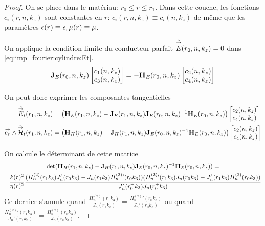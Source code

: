     \begin{proof}
      On se place dans le matériau: \(r_0 \le r \le r_ 1 \). Dans cette couche, les fonctions \(c_i(r,n,k_z)\) sont constantes en \(r\): \(c_i(r,n,k_z) \equiv c_i(n,k_z)\) de même que les paramètres \(\epsilon(r)\equiv \epsilon, \mu(r)\equiv \mu\).

      On applique la condition limite du conducteur parfait \(\hat {{\overset{\rightarrow}{E}}}(r_0,n,k_z) = 0\) dans \eqref{eq:imp_fourier:cylindre:Et}.
      \begin{equation*}
        \mathbf{J}_{E}(r_0,n,k_z)
        \begin{bmatrix}
          c_1(n,k_z) \\
          c_3(n,k_z)
        \end{bmatrix}
        =-\mathbf{H}_{E}(r_0,n,k_z)
        \begin{bmatrix}
          c_2(n,k_z) \\
          c_4(n,k_z)
        \end{bmatrix}
      \end{equation*}

      On peut donc exprimer les composantes tangentielles%
      \begin{align*}
        \hat {{\overset{\rightarrow}{E}}}_t(r_1,n,k_z) &=
        \left(\mathbf{H}_{E}(r_1,n,k_z) - \mathbf{J}_{E}(r_1,n,k_z)\mathbf{J}_{E}(r_0,n,k_z)^{-1}\mathbf{H}_{E}(r_0,n,k_z)\right)
        \begin{bmatrix}
          c_2(n,k_z) \\
          c_4(n,k_z)
        \end{bmatrix}
        \\
        {\overset{\rightarrow}{e_r}}\wedge \hat {{\overset{\rightarrow}{\mathcal{H}}}}_t(r_1,n,k_z) &=
        \left(\mathbf{H}_{H}(r_1,n,k_z) - \mathbf{J}_{H}(r_1,n,k_z)\mathbf{J}_{E}(r_0,n,k_z)^{-1}\mathbf{H}_{E}(r_0,n,k_z) \right)
        \begin{bmatrix}
          c_2(n,k_z) \\
          c_4(n,k_z)
        \end{bmatrix}
      \end{align*}

      On calcule le déterminant de cette matrice 
      \begin{multline*}
        \det(\mathbf{H}_{H}(r_1,n,k_z) - \mathbf{J}_{H}(r_1,n,k_z)\mathbf{J}_{E}(r_0,n,k_z)^{-1}\mathbf{H}_{E}(r_0,n,k_z)) = \\
        -\dfrac{k(r)^2}{\eta(r)^2}\dfrac{(H_n^{(2)}(r_1k_3)J_n'(r_0k_3)-J_n(r_1k_3)H_n^{(2)}{}'(r_0k_3))(H_n^{(2)}{}'(r_1k_3)J_n(r_0k_3)-J_n'(r_1k_3)H_n^{(2)}(r_0k_3))}{J_n'(r_0^+k_3)J_n(r_0^+k_3)}
      \end{multline*}
      Ce dernier s'annule quand \(\frac{H_n^{(2)}(r_1k_3)}{J_n(r_1k_3)} = \frac{H_n^{(2)}{}'(r_0k_3)}{J_n'(r_0k_3)}\) ou quand \(\frac{H_n^{(2)}{}'(r_1k_3)}{J_n'(r_1k_3)} = \frac{H_n^{(2)}(r_0k_3)}{J_n(r_0k_3)}\).


\end{proof}
